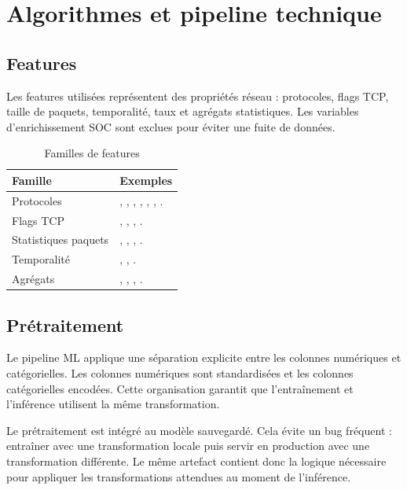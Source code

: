 \chapter{Algorithmes et pipeline technique}

\section{Features}
Les features utilisées représentent des propriétés réseau : protocoles, flags TCP, taille de paquets, temporalité, taux et agrégats statistiques. Les variables d'enrichissement SOC sont exclues pour éviter une fuite de données.

\begin{table}[H]
\centering
\caption{Familles de features}
\label{tab:features}
\begin{tabularx}{\linewidth}{@{}lY@{}}
\toprule
\textbf{Famille} & \textbf{Exemples}\\
\midrule
Protocoles & , , , , , , .\\
Flags TCP & , , , .\\
Statistiques paquets & , , , .\\
Temporalité & , , .\\
Agrégats & , , , .\\
\bottomrule
\end{tabularx}
\end{table}

\section{Prétraitement}
Le pipeline ML applique une séparation explicite entre les colonnes numériques et catégorielles. Les colonnes numériques sont standardisées et les colonnes catégorielles encodées. Cette organisation garantit que l'entraînement et l'inférence utilisent la même transformation.

Le prétraitement est intégré au modèle sauvegardé. Cela évite un bug fréquent : entraîner avec une transformation locale puis servir en production avec une transformation différente. Le même artefact  contient donc la logique nécessaire pour appliquer les transformations attendues au moment de l'inférence.

